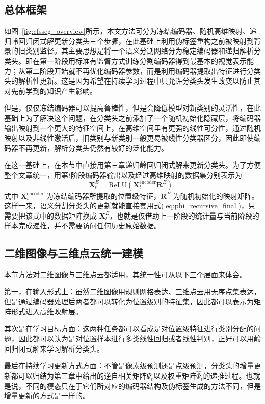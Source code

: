 \subsection{总体框架}

如图~\ref{fig:cfsseg_overview}所示，本文方法可分为冻结编码器、随机高维映射、递归岭回归闭式解更新分类头三个步骤，在此基础上利用伪标签重构之前被映射到背景的旧类别监督。其主要思想是将一个语义分割网络分为稳定编码器和递归解析分类头。即在第一阶段用标准有监督方式训练分割编码器得到最基本的视觉表示能力；从第二阶段开始就不再优化编码器参数，而是利用编码器提取出特征进行分类头的解析性更新。这是因为希望在持续学习过程中只允许分类头发生改变以防止其对先前学到的知识产生影响。

但是，仅仅冻结编码器可以提高鲁棒性，但是会降低模型对新类别的灵活性，在此基础上为了解决这个问题，在分类头之前添加了一个随机初始化隐藏层，将编码器输出映射到一个更大的特征空间上，在高维空间里有更强的线性可分性，通过随机映射以及非线性激活后，旧类别与新类别一般更易被线性分类器区分，因此即使编码器不再更新，解析分类头仍然有较好的泛化能力。

在这一基础上，在本节中直接用第三章递归岭回归闭式解来更新分类头。为了方便整个文章统一，用第$t$阶段编码器输出以及经过高维映射的数据集分别表示为
\begin{equation}
\mathbf{X}_t^{E} = \mathrm{ReLU}(\mathbf{X}_t^{\mathrm{encoder}}\mathbf{R}^E),
\label{eq:cfsseg_e}
\end{equation}
式中 $\mathbf{X}_t^{\mathrm{encoder}}$ 为冻结编码器所提取的位置级特征，$\mathbf{R}^E$ 为随机初始化的映射矩阵。这样一来，语义分割分类头的更新就能直接套用式(\ref{eq:phi_recursive_final})，只需要把该式中的数据矩阵换成 $\mathbf{X}_t^{E}$，也就是仅借助上一阶段的统计量与当前阶段的样本完成递推，并不需要访问任何历史原始数据。

\subsection{二维图像与三维点云统一建模}

本节方法对二维图像与三维点云都适用，其统一性可从以下三个层面来体会。

第一，在输入形式上：虽然二维图像用规则网格表达、三维点云用无序点集表达，但是通过编码器处理后两者都可以转化为位置级别的特征集，因此都可以表示为矩阵形式进入高维映射层。

其次是在学习目标方面：这两种任务都可以看成是对位置级特征进行类别分配的问题，因此都可以认为是对位置样本进行多类线性回归或者线性判别，正好可以用岭回归闭式解来学习解析分类头。

最后在持续学习更新方式方面：不管是像素级预测还是点级预测，分类头的增量更新都可以归结为第三章中给出的逆自相关矩阵$\Psi_t$以及权重矩阵$\widehat{\Phi}_t$的递推过程。也就是说，不同的模态只在于它们所对应的编码器结构及伪标签生成的方法不同，但是增量更新的方式是一样的。


